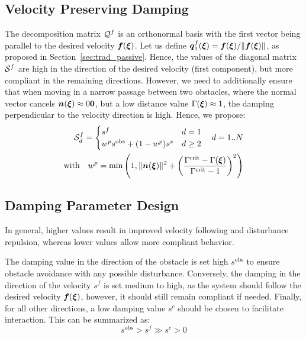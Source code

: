 \subsection{Velocity Preserving Damping}
The decomposition matrix $\mathcal{Q}^{f}$ is an orthonormal basis with the first vector being parallel to the desired velocity $\boldsymbol{f}(\boldsymbol{\xi})$. Let us define $\boldsymbol{q}^{f}_1 (\boldsymbol{\xi}) = \boldsymbol{f}({\boldsymbol{\xi}}) / \lVert \boldsymbol{f}({\boldsymbol{\xi}}) \rVert$, as proposed in Section~\ref{sec:trad_passive}. Hence, the values of the diagonal matrix $\mathcal{S}^{f}$ are high in the direction of the desired velocity (first component), but more compliant in the remaining directions. 
However, we need to additionally ensure that when moving in a narrow passage between two obstacles, where the normal vector cancels $\boldsymbol{n}(\boldsymbol{\xi}) \approx 0\boldsymbol{0}$, but a low distance value $\Gamma(\boldsymbol{\xi}) \approx 1$, the damping perpendicular to the velocity direction is high. Hence, we propose:
\begin{equation}
  \begin{split}
  \mathcal{S}^{f}_{d} =
  \begin{cases}
    s^{f} & d = 1 \\
    w^p s^{\mathrm{obs}} + (1- w^p) s^s & d \geq 2 
  \end{cases} \quad d = 1 .. N\\
  \text{with} \quad
   w^p = \min \left(1,  \| \boldsymbol{n}(\boldsymbol{\xi}) \|^2 + \left(\frac{\Gamma^{\mathrm{crit}} -\Gamma(\boldsymbol{\xi})}{\Gamma^{\mathrm{crit}} - 1}\right) ^2 \right)
  \end{split}
\end{equation}

\subsection{Damping Parameter Design}
In general, higher values result in improved velocity following and disturbance repulsion, whereas lower values allow more compliant behavior.

The damping value in the direction of the obstacle is set high $s^{\mathrm{obs}}$ to ensure obstacle avoidance with any possible disturbance. 
Conversely, the damping in the direction of the velocity $s^{f}$ is set medium to high, as the system should follow the desired velocity $\boldsymbol{f}(\boldsymbol{\xi})$, however, it should still remain compliant if needed.
Finally, for all other directions, a low damping value $s^{c}$ should be chosen to facilitate interaction.
This can be summarized as:
\begin{equation}
s^{\mathrm{obs}} > s^{f} \gg s^{c} > 0
\end{equation}
